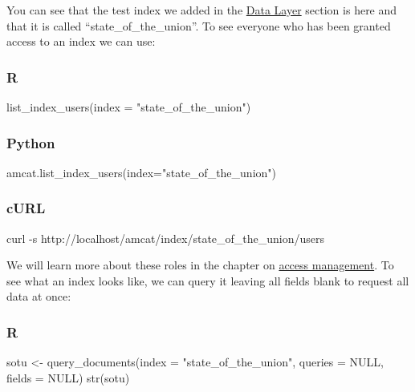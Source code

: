 \documentclass[
  letterpaper,
  DIV=11,
  numbers=noendperiod]{scrreprt}
\newenvironment{Shaded}{\begin{snugshade}}{\end{snugshade}}
\newcommand{\AttributeTok}[1]{\textcolor[rgb]{0.40,0.45,0.13}{#1}}
\newcommand{\ConstantTok}[1]{\textcolor[rgb]{0.56,0.35,0.01}{#1}}
\newcommand{\ExtensionTok}[1]{\textcolor[rgb]{0.00,0.23,0.31}{#1}}
\newcommand{\FunctionTok}[1]{\textcolor[rgb]{0.28,0.35,0.67}{#1}}
\newcommand{\NormalTok}[1]{\textcolor[rgb]{0.00,0.23,0.31}{#1}}
\newcommand{\OperatorTok}[1]{\textcolor[rgb]{0.37,0.37,0.37}{#1}}
\newcommand{\OtherTok}[1]{\textcolor[rgb]{0.00,0.23,0.31}{#1}}
\newcommand{\StringTok}[1]{\textcolor[rgb]{0.13,0.47,0.30}{#1}}
\begin{document}
You can see that the test index we added in the
\hyperref[data-layer]{Data Layer} section is here and that it is called
``state\_of\_the\_union''. To see everyone who has been granted access
to an index we can use:

\subsubsection{R}

\begin{Shaded}
\begin{Highlighting}[]
\FunctionTok{list\_index\_users}\NormalTok{(}\AttributeTok{index =} \StringTok{"state\_of\_the\_union"}\NormalTok{)}
\end{Highlighting}
\end{Shaded}

\subsubsection{Python}

\begin{Shaded}
\begin{Highlighting}[]
\NormalTok{amcat.list\_index\_users(index}\OperatorTok{=}\StringTok{"state\_of\_the\_union"}\NormalTok{)}
\end{Highlighting}
\end{Shaded}

\subsubsection{cURL}

\begin{Shaded}
\begin{Highlighting}[]
\ExtensionTok{curl} \AttributeTok{{-}s}\NormalTok{ http://localhost/amcat/index/state\_of\_the\_union/users}
\end{Highlighting}
\end{Shaded}

We will learn more about these roles in the chapter on
\hyperref[document-sharing-and-access-management]{access management}. To
see what an index looks like, we can query it leaving all fields blank
to request all data at once:

\subsubsection{R}

\begin{Shaded}
\begin{Highlighting}[]
\NormalTok{sotu }\OtherTok{\textless{}{-}} \FunctionTok{query\_documents}\NormalTok{(}\AttributeTok{index =} \StringTok{"state\_of\_the\_union"}\NormalTok{, }\AttributeTok{queries =} \ConstantTok{NULL}\NormalTok{, }\AttributeTok{fields =} \ConstantTok{NULL}\NormalTok{)}
\FunctionTok{str}\NormalTok{(sotu)}
\end{Highlighting}
\end{Shaded}
\end{document}
